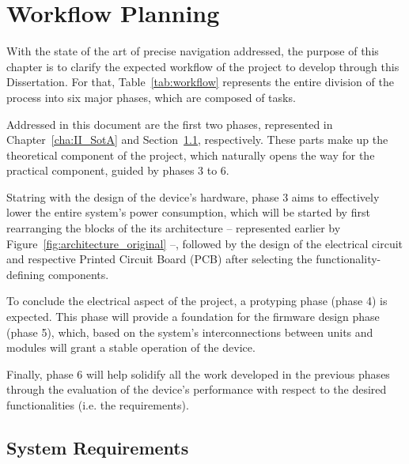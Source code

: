 

\chapter{Workflow Planning}\label{cha:III_workflow}

With the state of the art of precise navigation addressed, the purpose of this chapter is to clarify the expected workflow of the project to develop through this Dissertation. For that, Table~\ref{tab:workflow} represents the entire division of the process into six major phases, which are composed of tasks.

Addressed in this document are the first two phases, represented in Chapter~\ref{cha:II_SotA} and Section~\ref{sec:III_requirements}, respectively. These parts make up the theoretical component of the project, which naturally opens the way for the practical component, guided by phases 3 to 6.

Statring with the design of the device's hardware, phase 3 aims to effectively lower the entire system's power consumption, which will be started by first rearranging the blocks of the its architecture -- represented earlier by Figure~\ref{fig:architecture_original} --, followed by the design of the electrical circuit and respective Printed Circuit Board (PCB) after selecting the functionality-defining components.

To conclude the electrical aspect of the project, a protyping phase (phase 4) is expected. This phase will provide a foundation for the firmware design phase (phase 5), which, based on the system's interconnections between units and modules will grant a stable operation of the device.

Finally, phase 6 will help solidify all the work developed in the previous phases through the evaluation of the device's performance with respect to the desired functionalities (i.e. the requirements).

\section{System Requirements}\label{sec:III_requirements}

